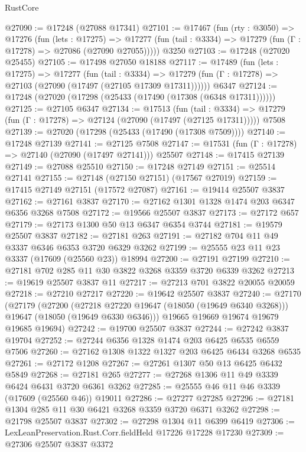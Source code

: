 \begin{lexlean}{RustCore}
\begin{coremodule}
@27090 := @17248 (@27088 @17341)
@27101 := @17467
    (fun (rty : @3050) =>
    @17276
      (fun (lets : @17275) =>
      @17277 (fun (tail : @3334) => @17279 (fun (Γ : @17278) => @27086 (@27090 @27055)))))
    @3250
@27103 := @17248 (@27020 @25455)
@27105 := @17498 @27050 @18188
@27117 := @17489
    (fun (lets : @17275) =>
    @17277
      (fun (tail : @3334) =>
      @17279 (fun (Γ : @17278) => @27103 (@27090 (@17497 (@27105 @17309 @17311))))))
    @6347
@27124 := @17248 (@27020 (@17298 (@25433 (@17490 (@17308 (@6348 @17311))))))
@27125 := @27105 @6347
@27134 := @17513
    (fun (tail : @3334) => @17279 (fun (Γ : @17278) => @27124 (@27090 (@17497 (@27125 @17311)))))
    @7508
@27139 := @27020 (@17298 (@25433 (@17490 (@17308 @7509))))
@27140 := @17248 @27139
@27141 := @27125 @7508
@27147 := @17531 (fun (Γ : @17278) => @27140 (@27090 (@17497 @27141))) @25507
@27148 := @17415 @27139
@27149 := @27088 @25510
@27150 := @17248 @27149
@27151 := @25514 @27141
@27155 := @27148 (@27150 @27151) (@17567 @27019)
@27159 := @17415 @27149 @27151 (@17572 @27087)
@27161 := @19414 @25507 @3837
@27162 := @27161 @3837
@27170 := @27162 @1301 @1328 @1474 @203 @6347 @6356 @3268 @7508
@27172 := @19566 @25507 @3837
@27173 := @27172 @657
@27179 := @27173 @1300 @50 @13 @6347 @6354 @3744
@27181 := @19579 @25507 @3837
@27182 := @27181 @263
@27191 := @27182 @704 @11 @49 @3337 @6346 @6353 @3720 @6329 @3262
@27199 := @25555 @23 @11 @23 @3337 (@17609 (@25560 @23)) @18994
@27200 := @27191 @27199
@27210 := @27181 @702 @285 @11 @30 @3822 @3268 @3359 @3720 @6339 @3262
@27213 := @19619 @25507 @3837 @11
@27217 := @27213 @701 @3822 @20055 @20059
@27218 := @27210 @27217
@27220 := @19642 @25507 @3837
@27240 := @27170
    (@27179
      (@27200
        (@27218 @27220 @19647 (@18050 (@19649 @6340 @3268)))
        @19647
        (@18050 (@19649 @6330 @6346)))
      @19665
      @19669
      @19674
      @19679
      @19685
      @19694)
@27242 := @19700 @25507 @3837
@27244 := @27242 @3837 @19704
@27252 := @27244 @6356 @1328 @1474 @203 @6425 @6535 @6559 @7506
@27260 := @27162 @1308 @1322 @1327 @203 @6425 @6434 @3268 @6535
@27261 := @27172 @1208
@27267 := @27261 @1307 @50 @13 @6425 @6432 @5849
@27268 := @27181 @265
@27277 := @27268 @1306 @11 @49 @3339 @6424 @6431 @3720 @6361 @3262
@27285 := @25555 @46 @11 @46 @3339 (@17609 (@25560 @46)) @19011
@27286 := @27277 @27285
@27296 := @27181 @1304 @285 @11 @30 @6421 @3268 @3359 @3720 @6371 @3262
@27298 := @21798 @25507 @3837
@27302 := @27298 @1304 @11 @6399 @6419
@27306 := LexLeanPreservation.Rust.Corr.fieldHeld @17226 @17228 @17230
@27309 := @27306 @25507 @3837 @3372

\end{coremodule}
\end{lexlean}
